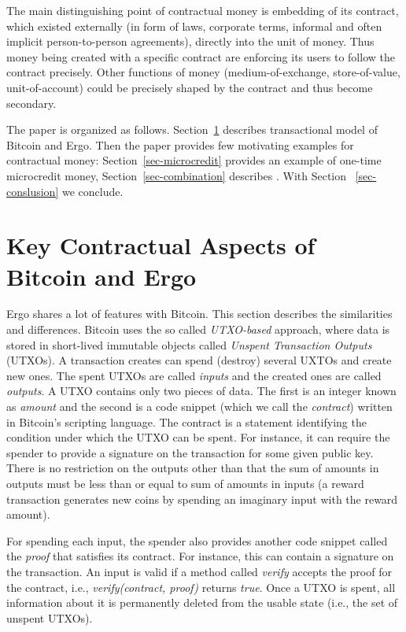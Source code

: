 \documentclass[]{llncs}   %
\begin{document}
The main distinguishing point of contractual money is embedding of its contract, which existed externally (in form of laws, corporate terms, informal and often implicit person-to-person agreements), directly into the unit of money. Thus money being created with a specific contract are enforcing its users to follow the contract precisely. Other functions of money (medium-of-exchange, store-of-value, unit-of-account) could be precisely shaped by the contract and thus become secondary.

The paper is organized as follows. Section~\ref{sec-txmodel} describes transactional model of Bitcoin and Ergo. Then the paper provides few motivating examples for contractual money: Section~\ref{sec-microcredit} provides an example of one-time microcredit money, Section~\ref{sec-combination} describes . With Section
~\ref{sec-conslusion} we conclude.


\section{Key Contractual Aspects of Bitcoin and Ergo }
\label{sec-txmodel}

Ergo shares a lot of features with Bitcoin. This section describes the similarities and differences. 
Bitcoin uses the so called {\em UTXO-based} approach, where data is stored in short-lived immutable objects called {\em Unspent Transaction Outputs} (UTXOs). A transaction creates can spend (destroy) several UXTOs and create new ones. The spent UTXOs are called {\em inputs} and the created ones are called {\em outputs}. A UTXO contains only two pieces of data. The first is an integer known as {\em amount} and the second is a code snippet (which we call the {\em contract}) written in Bitcoin's scripting language. The contract is a statement identifying the condition under which the UTXO can be spent. For instance, it can require the spender to provide a signature on the transaction for some given public key. 
There is no restriction on the outputs other than that the sum of amounts in outputs must be less than or equal to sum of amounts in inputs (a reward transaction generates new coins by spending an imaginary input with the reward amount).

For spending each input, the spender also provides another code snippet called the {\em proof} that satisfies its contract. For instance, this can contain a signature on the transaction. An input is valid if a method called {\em verify} accepts the proof for the contract, i.e., {\em verify(contract, proof)} returns {\em true}. Once a UTXO is spent, all information about it is permanently deleted from the usable state (i.e., the set of unspent UTXOs). 
\end{document}
